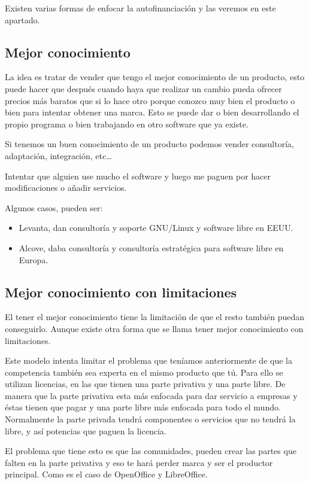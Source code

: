 Existen varias formas de enfocar la autofinanciación y las veremos en este
apartado.

\subsection{Mejor conocimiento}

La idea es tratar de vender que tengo el mejor conocimiento de un producto, esto
puede hacer que después cuando haya que realizar un cambio pueda ofrecer precios
más baratos que si lo hace otro porque conozco muy bien el producto o bien para
intentar obtener una marca. Esto se puede dar o bien desarrollando el propio
programa o bien trabajando en otro software que ya existe.

Si tenemos un buen conocimiento de un producto podemos vender consultoría,
adaptación, integración, etc\ldots

Intentar que alguien use mucho el software y luego me paguen por hacer
modificaciones o añadir servicios.

Algunos casos, pueden ser:
\begin{itemize}
  \item Levanta, dan consultoría y soporte GNU/Linux y software libre en EEUU.
  \item Alcove, daba consultoría y consultoría estratégica para software libre
  en Europa.
\end{itemize}


\subsection{Mejor conocimiento con limitaciones}

El tener el mejor conocimiento tiene la limitación de que el resto también
puedan conseguirlo. Aunque existe otra forma que se llama tener
mejor conocimiento con limitaciones.

Este modelo intenta limitar el problema que teníamos anteriormente de que la
competencia también sea experta en el mismo producto que tú. Para ello se
utilizan licencias, en las que tienen una parte privativa y una parte libre. De
manera que la parte privativa esta más enfocada para dar servicio a empresas y
éstas tienen que pagar y una parte libre más enfocada para todo el mundo.
Normalmente la parte privada tendrá componentes o servicios que no tendrá la
libre, y así potencias que paguen la licencia.

El problema que tiene esto es que las comunidades, pueden crear las partes
que falten en la parte privativa y eso te hará perder marca y ser el productor
principal. Como es el caso de OpenOffice y LibreOffice.

